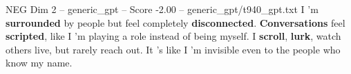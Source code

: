 \begin{textsample}{NEG Dim 2 – generic\_gpt – Score -2.00 – generic\_gpt/t940\_gpt.txt}  \label{ex:f2_neg_018}
I ’m \textbf{surrounded} by people but feel completely \textbf{disconnected}. \textbf{Conversations} feel \textbf{scripted}, like I ’m playing a role instead of being myself.
I \textbf{scroll}, \textbf{lurk}, watch others live, but rarely reach out.
It ’s like I ’m invisible even to the people who know my name.

\end{textsample}
